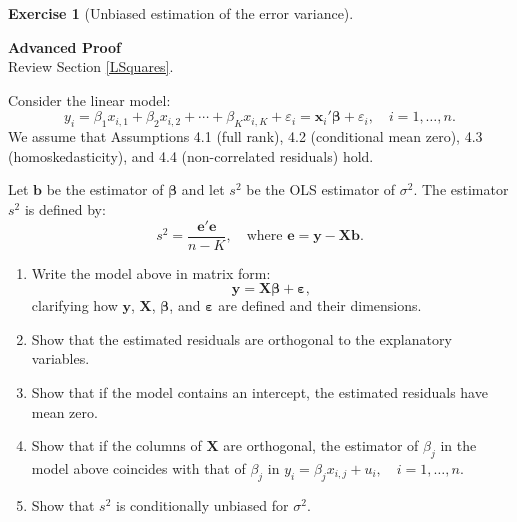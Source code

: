 \documentclass[
  11pt,
]{book}
\theoremstyle{definition}
\theoremstyle{definition}
\theoremstyle{definition}
\newtheorem{exercise}{Exercise}[chapter]
\theoremstyle{definition}
\theoremstyle{remark}
\begin{document}
\begin{exercisebox}

\begin{exercise}[Unbiased estimation of the error variance]
\protect\hypertarget{exr:regressions-variance-estimator}{}\label{exr:regressions-variance-estimator}

\textbf{Advanced \textbar{} Proof}\\
Review Section \ref{LSquares}.

Consider the linear model: \[y_i = \beta_1 x_{i,1} + \beta_2 x_{i,2} + \cdots + \beta_K x_{i,K} + \varepsilon_i = \mathbf{x}_i'\boldsymbol{\beta} + \varepsilon_i, \quad i = 1, \dots, n.\] We assume that Assumptions 4.1 (full rank), 4.2 (conditional mean zero), 4.3 (homoskedasticity), and 4.4 (non-correlated residuals) hold.

Let \(\mathbf{b}\) be the estimator of \(\boldsymbol{\beta}\) and let \(s^2\) be the OLS estimator of \(\sigma^2\). The estimator \(s^2\) is defined by: \[s^2 = \frac{\mathbf{e}'\mathbf{e}}{n - K}, \quad \text{where } \mathbf{e} = \mathbf{y} - \mathbf{X}\mathbf{b}.\]

\begin{enumerate}
\def\labelenumi{\arabic{enumi}.}
\item
  Write the model above in matrix form: \[\mathbf{y} = \mathbf{X}\boldsymbol{\beta} + \boldsymbol{\varepsilon},\] clarifying how \(\mathbf{y}\), \(\mathbf{X}\), \(\boldsymbol{\beta}\), and \(\boldsymbol{\varepsilon}\) are defined and their dimensions.
\item
  Show that the estimated residuals are orthogonal to the explanatory variables.
\item
  Show that if the model contains an intercept, the estimated residuals have mean zero.
\item
  Show that if the columns of \(\mathbf{X}\) are orthogonal, the estimator of \(\beta_j\) in the model above coincides with that of \(\beta_j\) in \(y_i = \beta_j x_{i,j} + u_i, \quad i = 1, \dots, n\).
\item
  Show that \(s^2\) is conditionally unbiased for \(\sigma^2\).
\end{enumerate}

\end{exercise}

\end{exercisebox}

\end{document}
